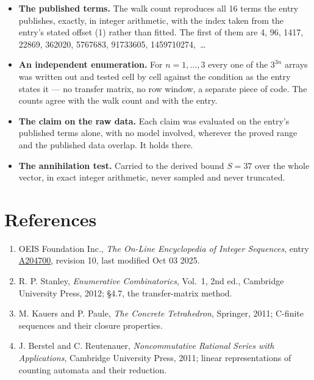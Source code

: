 \documentclass[11pt]{article}
\theoremstyle{definition}
\begin{document}
\begin{itemize}

\item {\bfseries The published terms.} The walk count reproduces all 16 terms the entry publishes, exactly, in integer arithmetic, with the index taken from the entry's stated offset (1) rather than fitted. The first of them are 4, 96, 1417, 22869, 362020, 5767683, 91733605, 1459710274,~\dots

\item {\bfseries An independent enumeration.} For $n = 1,\dots,3$ every one of the $3^{3n}$ arrays was written out and tested cell by cell against the condition as the entry states it --- no transfer matrix, no row window, a separate piece of code. The counts agree with the walk count and with the entry.

\item {\bfseries The claim on the raw data.} Each claim was evaluated on the entry's published terms alone, with no model involved, wherever the proved range and the published data overlap. It holds there.

\item {\bfseries The annihilation test.} Carried to the derived bound $S = 37$ over the whole vector, in exact integer arithmetic, never sampled and never truncated.

\end{itemize}

\section{References}

\begin{enumerate}

\item OEIS Foundation Inc., \emph{The On-Line Encyclopedia of Integer Sequences}, entry \href{https://oeis.org/A204700}{A204700}, revision 10, last modified Oct 03 2025.

\item R. P. Stanley, \emph{Enumerative Combinatorics}, Vol.~1, 2nd ed., Cambridge University Press, 2012; \S4.7, the transfer-matrix method.

\item M. Kauers and P. Paule, \emph{The Concrete Tetrahedron}, Springer, 2011; C-finite sequences and their closure properties.

\item J. Berstel and C. Reutenauer, \emph{Noncommutative Rational Series with Applications}, Cambridge University Press, 2011; linear representations of counting automata and their reduction.

\end{enumerate}
\end{document}
